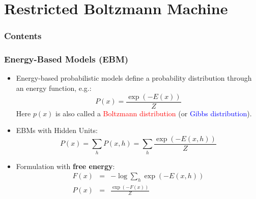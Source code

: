 \documentclass{beamer}
\newcommand{\tr}[1]{\textcolor{red}{#1}} %
\newcommand{\tb}[1]{\textcolor{blue}{#1}} %
\begin{document}
\section{Restricted Boltzmann Machine}

\begin{frame}
  \frametitle{Contents}
  \tableofcontents[currentsection]
\end{frame}

\begin{frame}
\frametitle{Energy-Based Models (EBM)}
\begin{itemize}
\item 
Energy-based probabilistic models define a probability distribution through an energy function, e.g.:
\begin{equation}
P(x)=\frac{\exp(-E(x))}{Z}
\end{equation}
Here $p(x)$ is also called a \tr{Boltzmann distribution} (or \tb{Gibbs distribution}).
\item 
EBMs with Hidden Units:
\begin{equation}
P(x)=\sum_h P(x, h)=\sum_h \frac{\exp(-E(x,h))}{Z}
\end{equation}
\item 
Formulation with \textbf{free energy}:
\begin{eqnarray}
F(x)&=&-\log \sum_h \exp(-E(x, h))\\
P(x)&=&\frac{\exp(-F(x))}{Z}
\end{eqnarray}
\end{itemize}

\end{frame}

\end{document}
